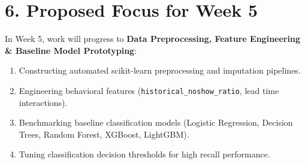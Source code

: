 \documentclass[11pt,a4paper]{article}
\begin{document}
\section*{6. Proposed Focus for Week 5}
In Week 5, work will progress to \textbf{Data Preprocessing, Feature Engineering \& Baseline Model Prototyping}:
\begin{enumerate}
    \item Constructing automated scikit-learn preprocessing and imputation pipelines.
    \item Engineering behavioral features (\texttt{historical\_noshow\_ratio}, lead time interactions).
    \item Benchmarking baseline classification models (Logistic Regression, Decision Trees, Random Forest, XGBoost, LightGBM).
    \item Tuning classification decision thresholds for high recall performance.
\end{enumerate}
\end{document}
